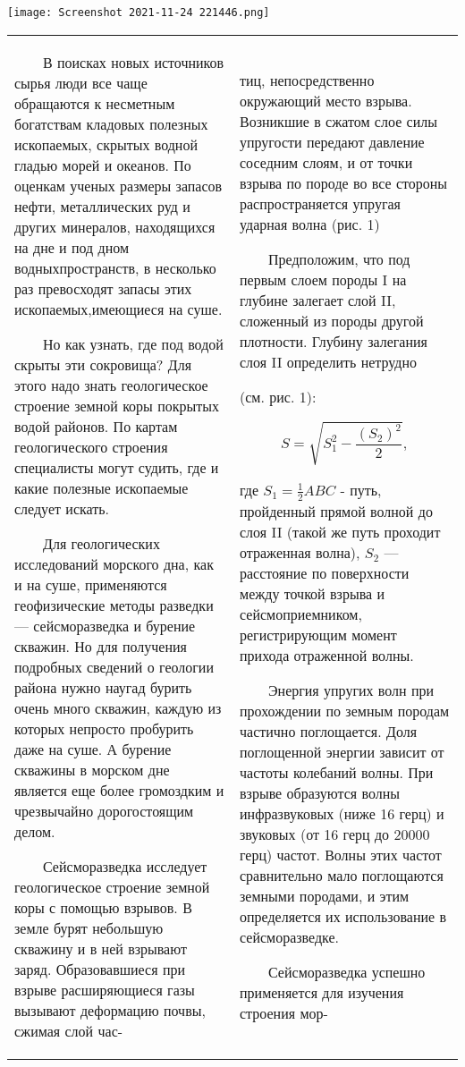 \setcounter{page}{6}

\texttt{[image: Screenshot 2021-11-24 221446.png]}


\begin{tabular}{p{0.5\linewidth} p{0.5\linewidth}}
~~~~В поисках новых источников сырья люди все чаще обращаются к несметным богатствам кладовых полезных ископаемых, скрытых водной гладью морей и океанов. По оценкам ученых размеры запасов нефти, металлических руд и других минералов, находящихся на дне и под дном водныхпространств, в несколько раз превосходят запасы этих ископаемых,имеющиеся на суше.

~~~~Но как узнать, где под водой скрыты эти сокровища? Для этого надо знать геологическое строение земной коры покрытых водой районов. По картам геологического строения специалисты могут судить, где и какие полезные ископаемые следует искать.

~~~~Для геологических исследований морского дна, как и на суше, применяются геофизические методы разведки — сейсморазведка и бурение скважин. Но для получения подробных сведений о геологии района нужно наугад бурить очень много скважин, каждую из которых непросто пробурить даже на суше. А бурение скважины в морском дне является еще более громоздким и чрезвычайно дорогостоящим делом.

~~~~Сейсморазведка исследует геологическое строение земной коры с помощью взрывов. В земле бурят небольшую скважину и в ней взрывают заряд. Образовавшиеся при взрыве расширяющиеся газы вызывают деформацию почвы, сжимая слой час-& тиц, непосредственно окружающий место взрыва. Возникшие в сжатом слое силы упругости передают давление соседним слоям, и от точки взрыва по породе во все стороны распространяется упругая ударная волна (рис. 1)

~~~~Предположим, что под первым слоем породы I на глубине  залегает слой II, сложенный из породы другой плотности. Глубину залегания слоя II определить нетрудно

(см. рис. 1):

\begin{displaymath}S=\sqrt{S_1^2 - \frac{(S_2)^2}{2}} ,\end{displaymath}

где $S_1 = \frac{1}{2}ABC$ - путь,  пройденный
прямой волной до слоя II (такой же путь проходит отраженная волна), $S_2$ — расстояние по поверхности между точкой взрыва и сейсмоприемником, регистрирующим момент прихода отраженной волны.

~~~~Энергия упругих волн при прохождении по земным породам частично поглощается. Доля поглощенной энергии зависит от частоты колебаний волны. При взрыве образуются волны инфразвуковых (ниже 16 герц) и звуковых (от 16 герц до 20000 герц) частот. Волны этих частот сравнительно мало поглощаются земными породами, и этим определяется их использование в сейсморазведке.

~~~~Сейсморазведка успешно применяется для изучения строения мор-
\end{tabular}

